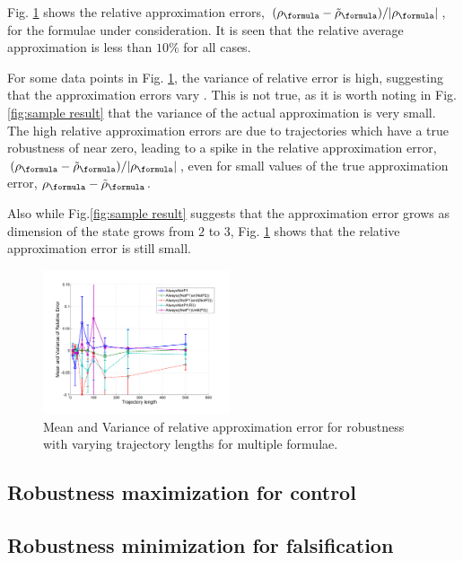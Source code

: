 Fig. \ref{fig:relative error} shows the relative approximation errors, $(\robf-\srobf)/|\robf|$, for the formulae under consideration. It is seen that the relative average approximation is less than $10\%$ for all cases. 

For some data points in Fig. \ref{fig:relative error}, the variance of relative error is high, suggesting that the approximation errors vary . This is not true, as it is worth noting in Fig. \ref{fig:sample result} that the variance of the actual approximation is very small. The high relative approximation errors are due to trajectories which have a true robustness of near zero, leading to a spike in the relative approximation error, $(\robf-\srobf)/|\robf|$, even for small values of the true approximation error, $\robf-\srobf$.

Also while Fig.\ref{fig:sample result} suggests that the approximation error grows as dimension of the state grows from $2$ to $3$, Fig. \ref{fig:relative error} shows that the relative approximation error is still small. 

\begin{figure}[t]
\centering
\includegraphics[width=0.49\textwidth]{figures/RobustnessErrorRel}
\caption{Mean and Variance of relative approximation error for robustness with varying trajectory lengths for multiple formulae.}
\label{fig:relative error}
\end{figure}


\subsection{Robustness maximization for control}
\label{sec:toy example}


\subsection{Robustness minimization for falsification}
\label{sec:toy falsification}
